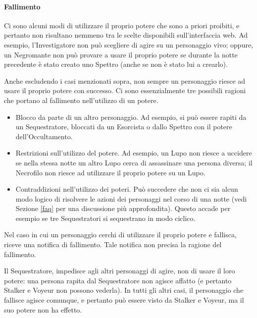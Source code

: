 \documentclass[a4paper,10pt]{article}
\begin{document}
\paragraph{Fallimento} Ci sono alcuni modi di utilizzare il proprio potere che sono a priori proibiti, e pertanto non risultano nemmeno tra le scelte disponibili sull'interfaccia web. Ad esempio, l'Investigatore non può scegliere di agire su un personaggio vivo; oppure, un Negromante non può provare a usare il proprio potere se durante la notte precedente è stato creato uno Spettro (anche se non è stato lui a crearlo).

Anche escludendo i casi menzionati sopra, non sempre un personaggio riesce ad usare il proprio potere con successo.
Ci sono essenzialmente tre possibili ragioni che portano al fallimento nell'utilizzo di un potere.
\begin{itemize}
 \item Blocco da parte di un altro personaggio. Ad esempio, si può essere rapiti da un Sequestratore, bloccati da un Esorcista o dallo Spettro con il potere dell'Occultamento.
 \item Restrizioni sull'utilizzo del potere. Ad esempio, un Lupo non riesce a uccidere se nella stessa notte un altro Lupo cerca di assassinare una persona diversa; il Necrofilo non riesce ad utilizzare il proprio potere su un Lupo.
 \item Contraddizioni nell'utilizzo dei poteri. Può succedere che non ci sia alcun modo logico di risolvere le azioni dei personaggi nel corso di una notte (vedi Sezione \ref{faq} per una discussione più approfondita). Questo accade per esempio se tre Sequestratori si sequestrano in modo ciclico.
\end{itemize}

Nel caso in cui un personaggio cerchi di utilizzare il proprio potere e fallisca, riceve una notifica di fallimento. Tale notifica non precisa la ragione del fallimento.

Il Sequestratore, impedisce agli altri personaggi di agire, non di usare il loro potere: una persona rapita dal Sequestratore non agisce affatto (e pertanto Stalker e Voyeur non possono vederla).
In tutti gli altri casi, il personaggio che fallisce agisce comunque, e pertanto può essere visto da Stalker e Voyeur, ma il suo potere non ha effetto. 
\end{document}
